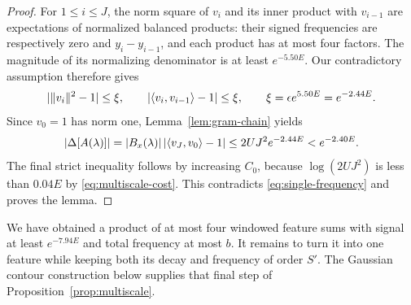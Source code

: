 \begin{proof}
For $1\le i\le J$, the norm square of $v_i$ and its inner product with
$v_{i-1}$ are expectations of normalized balanced products: their signed
frequencies are respectively zero and
$y_i-y_{i-1}$, and each product has at most four factors.  The magnitude of its
normalizing denominator is at least $e^{-5.50E}$.  Our contradictory
assumption therefore gives
\[
 \lvert \lVert v_i\rVert^2-1\rvert\le\xi,\qquad
 \lvert \langle v_i,v_{i-1}\rangle-1\rvert\le\xi,
 \qquad \xi=\epsilon e^{5.50E}=e^{-2.44E}.
\]
Since $v_0=1$ has norm one, Lemma~\ref{lem:gram-chain} yields
\[
 \lvert \Delta[A(\lambda)]\rvert
 =\lvert B_x(\lambda)\rvert\,
       \lvert \langle v_J,v_0\rangle-1\rvert
 \le2UJ^2e^{-2.44E}<e^{-2.40E}.
\]
The final strict inequality follows by increasing $C_0$, because
$\log(2UJ^2)$ is less than $0.04E$ by \eqref{eq:multiscale-cost}.
This contradicts \eqref{eq:single-frequency} and proves the lemma.
\end{proof}

We have obtained a product of at most four windowed feature sums with signal
at least $e^{-7.94E}$ and total frequency at most $b$.  It remains to turn it
into one feature while keeping both its decay and frequency of order $S'$.
The Gaussian contour construction below supplies that final step of
Proposition~\ref{prop:multiscale}.
